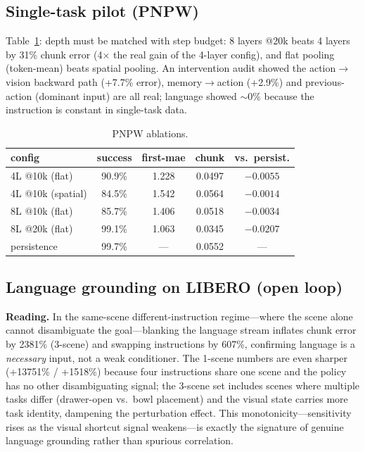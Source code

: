 \documentclass[10pt,twocolumn]{article}
\begin{document}
\subsection{Single-task pilot (PNPW)}
\label{sec:pnpw}
Table~\ref{tab:pnpw}: depth must be matched with step budget: 8 layers
@20k beats 4 layers by 31\% chunk error (4$\times$ the real gain of the
4-layer config), and flat pooling (token-mean) beats spatial pooling. An
intervention audit showed the action$\rightarrow$vision backward path
(+7.7\% error), memory$\rightarrow$action (+2.9\%) and previous-action
(dominant input) are all real; language showed $\sim$0\% because the
instruction is constant in single-task data.

\begin{table}[t]
\centering\small
\caption{PNPW ablations.}
\label{tab:pnpw}
\begin{tabular}{lcccc}
\toprule
config & success & first-mae & chunk & vs.\ persist. \\
\midrule
4L @10k (flat) & 90.9\% & 1.228 & 0.0497 & $-0.0055$\\
4L @10k (spatial) & 84.5\% & 1.542 & 0.0564 & $-0.0014$\\
8L @10k (flat) & 85.7\% & 1.406 & 0.0518 & $-0.0034$\\
8L @20k (flat) & 99.1\% & 1.063 & 0.0345 & $-0.0207$\\
persistence & 99.7\% & --- & 0.0552 & ---\\
\bottomrule
\end{tabular}
\end{table}

\subsection{Language grounding on LIBERO (open loop)}
\label{sec:libero}

\textbf{Reading.} In the same-scene different-instruction regime---where the
scene alone cannot disambiguate the goal---blanking the language stream
inflates chunk error by 2381\% (3-scene) and swapping instructions by 607\%,
confirming language is a \emph{necessary} input, not a weak conditioner. The
1-scene numbers are even sharper (+13751\% / +1518\%) because four
instructions share one scene and the policy has no other disambiguating
signal; the 3-scene set includes scenes where multiple tasks differ
(drawer-open vs.\ bowl placement) and the visual state carries more task
identity, dampening the perturbation effect. This monotonicity---sensitivity
rises as the visual shortcut signal weakens---is exactly the signature of
genuine language grounding rather than spurious correlation.
\end{document}
